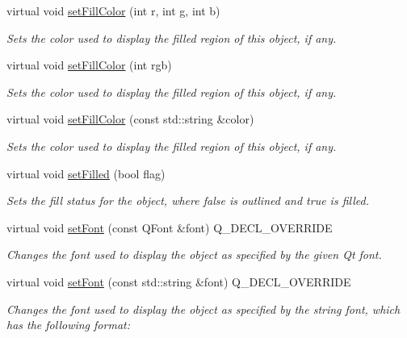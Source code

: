 \begin{DoxyCompactItemize}
virtual void \mbox{\hyperlink{classGObject_ad767a33971159e9493e221cca4c00ae9}{set\+Fill\+Color}} (int r, int g, int b)
\begin{DoxyCompactList}\small\item\em Sets the color used to display the filled region of this object, if any. \end{DoxyCompactList}\item 
virtual void \mbox{\hyperlink{classGObject_aa59d9775a67fa7df2b24a95cd34840a3}{set\+Fill\+Color}} (int rgb)
\begin{DoxyCompactList}\small\item\em Sets the color used to display the filled region of this object, if any. \end{DoxyCompactList}\item 
virtual void \mbox{\hyperlink{classGObject_adbc18b1a930aadd97d7437f9f7265b96}{set\+Fill\+Color}} (const std\+::string \&color)
\begin{DoxyCompactList}\small\item\em Sets the color used to display the filled region of this object, if any. \end{DoxyCompactList}\item 
virtual void \mbox{\hyperlink{classGObject_a9b82b53362282c6bb7d6947068d2e55b}{set\+Filled}} (bool flag)
\begin{DoxyCompactList}\small\item\em Sets the fill status for the object, where {\ttfamily false} is outlined and {\ttfamily true} is filled. \end{DoxyCompactList}\item 
virtual void \mbox{\hyperlink{classGText_a2d22014c7fa3bccfd58c982aea1b55fa}{set\+Font}} (const Q\+Font \&font) Q\+\_\+\+D\+E\+C\+L\+\_\+\+O\+V\+E\+R\+R\+I\+DE
\begin{DoxyCompactList}\small\item\em Changes the font used to display the object as specified by the given Qt font. \end{DoxyCompactList}\item 
virtual void \mbox{\hyperlink{classGText_ab39ef411fb13a52852ddd138c5932e2e}{set\+Font}} (const std\+::string \&font) Q\+\_\+\+D\+E\+C\+L\+\_\+\+O\+V\+E\+R\+R\+I\+DE
\begin{DoxyCompactList}\small\item\em Changes the font used to display the object as specified by the string {\ttfamily font}, which has the following format\+: \end{DoxyCompactList}\item 

\end{DoxyCompactItemize}
